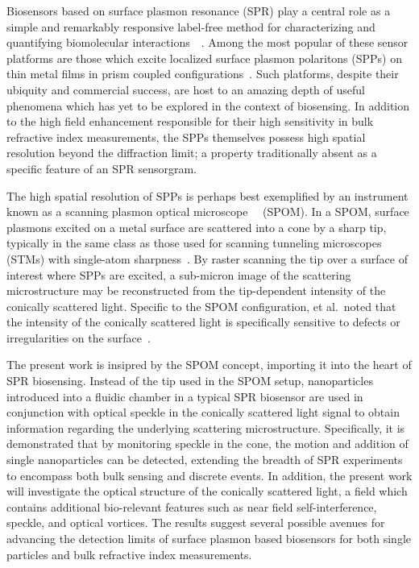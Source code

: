 Biosensors based on surface plasmon resonance (SPR) play a central role as
a simple and remarkably responsive label-free method for characterizing and
quantifying biomolecular
interactions~\cite{homola1999surface}~\cite{homola2006surface}.  Among the
most popular of these sensor platforms are those which excite localized
surface plasmon polaritons (SPPs) on thin metal films in prism coupled
configurations~\cite{hoa2007towards}.  Such platforms, despite their
ubiquity and commercial success, are host to an amazing depth of useful
phenomena which has yet to be explored in the context of biosensing.  In
addition to the high field enhancement responsible for their high
sensitivity in bulk refractive index measurements, the SPPs themselves
possess high spatial resolution beyond the diffraction limit; a property
traditionally absent as a specific feature of an SPR sensorgram.  

The high spatial resolution of SPPs is perhaps best exemplified by an
instrument known as a scanning plasmon optical
microscope~\cite{kim1995scanning}~\cite{kim1996scanning} (SPOM).  In a
SPOM, surface plasmons excited on a metal surface are scattered into a cone
by a sharp tip, typically in the same class as those used for scanning
tunneling microscopes (STMs) with single-atom
sharpness~\cite{binnig2000scanning}.  By raster scanning the tip over a
surface of interest where SPPs are excited, a sub-micron image of the
scattering microstructure may be reconstructed from the tip-dependent
intensity of the conically scattered light.  Specific to the SPOM
configuration,  et al.\ noted that the intensity of the conically
scattered light is specifically sensitive to defects or irregularities on
the surface~\cite{kim1996scanning}.  

The present work is insipred by the SPOM concept, importing it into the
heart of SPR biosensing.  Instead of the tip used in the SPOM setup,
nanoparticles introduced into a fluidic chamber in a typical SPR biosensor
are used in conjunction with optical speckle in the conically scattered
light signal to obtain information regarding the underlying scattering
microstructure.  Specifically, it is demonstrated that by monitoring
speckle in the cone, the motion and addition of single nanoparticles can be
detected, extending the breadth of SPR experiments to encompass both bulk
sensing and discrete events.  In addition, the present work will
investigate the optical structure of the conically scattered light, a field
which contains additional bio-relevant features such as near field
self-interference, speckle, and optical vortices.  The results suggest
several possible avenues for advancing the detection limits of surface
plasmon based biosensors for both single particles and bulk refractive
index measurements.

